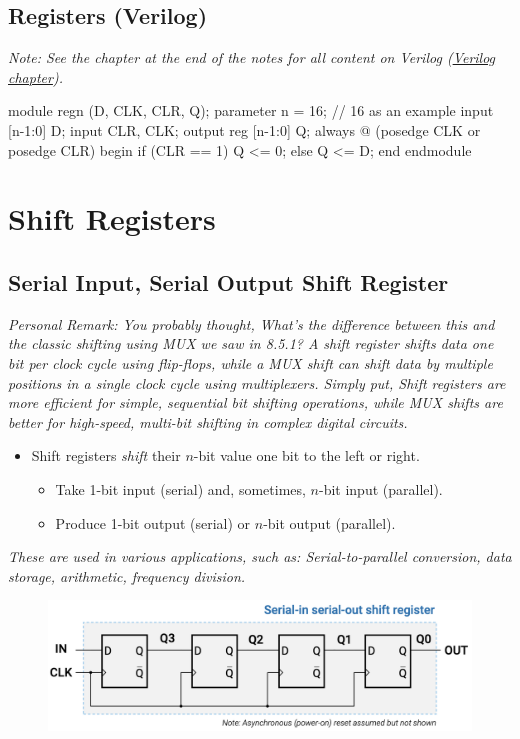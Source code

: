 \documentclass[12pt,openany]{book}
\begin{document}
\newpage 
\subsection{Registers (Verilog)}
 \textit{Note: See the chapter at the end of the notes for all content on Verilog (\hyperref[Verilog]{Verilog chapter}).}

\begin{vhdl}
module regn (D, CLK, CLR, Q);
parameter n = 16; // 16 as an example
input [n-1:0] D;
input CLR, CLK;
output reg [n-1:0] Q;
always @ (posedge CLK or posedge CLR)
	begin
		if (CLR == 1)
			Q <= 0;
	else
		Q <= D;
end
endmodule
\end{vhdl}

\section{Shift Registers}
\subsection{Serial Input, Serial Output Shift Register}
\textit{Personal Remark: You probably thought, What's the difference between this and the classic shifting using MUX we saw in 8.5.1? \newline A shift register shifts data one bit per clock cycle using flip-flops, while a MUX shift can shift data by multiple positions in a single clock cycle using multiplexers. Simply put, Shift registers are more efficient for simple, sequential bit shifting operations, while MUX shifts are better for high-speed, multi-bit shifting in complex digital circuits. }
\begin{itemize}
    \item[] Shift registers \textit{shift} their \(n\)-bit value one bit to the left or right.
    \begin{itemize}
        \item Take 1-bit input (serial) and, sometimes, \(n\)-bit input (parallel).
        \item Produce 1-bit output (serial) or \(n\)-bit output (parallel).
    \end{itemize}
\end{itemize}

\textit{These are used in various applications, such as: \newline Serial-to-parallel conversion, data storage, arithmetic, frequency division.}
\begin{figure}[h]
    \centering
    \includegraphics[width=1.2\textwidth]{circuits/14.1.2.png}
\end{figure}
\end{document}
